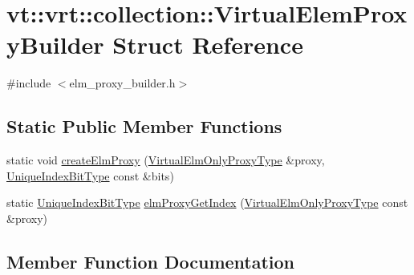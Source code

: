 \hypertarget{structvt_1_1vrt_1_1collection_1_1_virtual_elem_proxy_builder}{}\section{vt\+:\+:vrt\+:\+:collection\+:\+:Virtual\+Elem\+Proxy\+Builder Struct Reference}
\label{structvt_1_1vrt_1_1collection_1_1_virtual_elem_proxy_builder}


{\ttfamily \#include $<$elm\+\_\+proxy\+\_\+builder.\+h$>$}

\subsection*{Static Public Member Functions}
\begin{DoxyCompactItemize}
\item 
static void \hyperlink{structvt_1_1vrt_1_1collection_1_1_virtual_elem_proxy_builder_a50a059dda66ba93eccb4be529fd499c2}{create\+Elm\+Proxy} (\hyperlink{namespacevt_aa68633cd16822ae31c1cf521f817a23e}{Virtual\+Elm\+Only\+Proxy\+Type} \&proxy, \hyperlink{namespacevt_a913e1f07b5228dd8bb64040dc6dcea14}{Unique\+Index\+Bit\+Type} const \&bits)
\item 
static \hyperlink{namespacevt_a913e1f07b5228dd8bb64040dc6dcea14}{Unique\+Index\+Bit\+Type} \hyperlink{structvt_1_1vrt_1_1collection_1_1_virtual_elem_proxy_builder_a8143b940105dd88b4c5733a0ce19c923}{elm\+Proxy\+Get\+Index} (\hyperlink{namespacevt_aa68633cd16822ae31c1cf521f817a23e}{Virtual\+Elm\+Only\+Proxy\+Type} const \&proxy)
\end{DoxyCompactItemize}


\subsection{Member Function Documentation}
\mbox{\label{structvt_1_1vrt_1_1collection_1_1_virtual_elem_proxy_builder_a50a059dda66ba93eccb4be529fd499c2}} 
